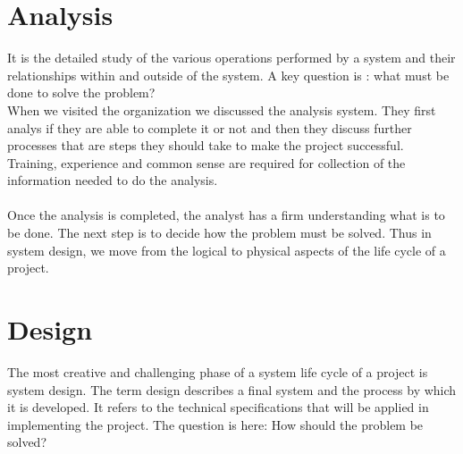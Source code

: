 \documentclass[a4paper,12pt]{report}
\begin{document}
\section{Analysis}
 It is the detailed study of the various operations performed by a system and their relationships within and outside of the system. A key question is : what must be done to solve the problem?\\ 
 
 When we visited the organization we discussed the analysis system. They first analys if they are able to complete it or not and then they discuss further processes that are steps they should take to make the project successful. Training, experience and common sense are required for collection of the information needed to do the analysis.
 \\ \\
 Once the analysis is completed, the analyst has a firm understanding what is to be done. The next step is to decide how the problem must be solved. Thus in system design, we move from the logical to physical aspects of the life cycle of a project.\\
 \section{Design}
 The most creative and challenging phase of a system life cycle of a project is system design. The term design describes a final system and the process by which it is developed. It refers to the technical specifications that will be applied in implementing the project. The question is here: How should the problem be solved?\\
 
\end{document}
